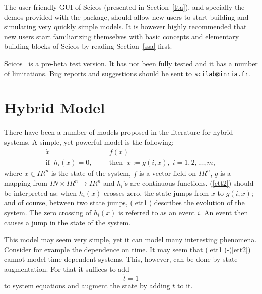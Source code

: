The user-friendly GUI of Scicos   (presented in Section~\ref{tta}), 
and specially the demos provided with the package, should allow new
users to start building and simulating very quickly simple models. It
is however highly recommended that new  users start familiarizing
themselves with basic concepts and elementary building blocks of
Scicos   by reading Section~\ref{ssa} first.  

Scicos  \version\ is a pre-beta test version. It has not been fully tested
and it has a number of limitations. Bug reports and suggestions should
be sent to {\tt scilab@inria.fr}.



\setcounter{equation}{0}
\section{Hybrid Model}
There have been a number of models proposed in the literature for
hybrid systems. A simple, yet powerful model is the following:
\begin{eqnarray}
\dot{x} &=& f(x) \label{ett1} \\
\mbox{if}\;\;h_i(x)=0,&&\mbox{then}\;\;x:=g(i,x) ,\;i=1,2,...,m, \label{ett2}
\end{eqnarray}
where $x\in I\!\!R^n$ is the state of the system, $f$ is a vector
field on $I\!\!R^n$, $g$ is a mapping from $I\!\!N\times I\!\!R^n
\rightarrow I\!\!R^n$ and $h_i$'s are continuous
functions. (\ref{ett2}) should be interpreted as: when $h_i(x)$ crosses
zero, the state jumps from $x$ to $g(i,x)$; and of course, between two
state jumps, (\ref{ett1}) describes the evolution of the system. The
zero crossing of $h_i(x)$ is referred to as an event $i$. An event
then causes a jump in the state of the system.

This model may seem very simple, yet it can model many interesting
phenomena. Consider for example the dependence on time. It may seem that
(\ref{ett1})-(\ref{ett2}) cannot model time-dependent systems. This,
however, can be done by state augmentation. For that it suffices to
add 
\begin{equation}
\dot{t}=1
\end{equation}
to system equations and augment the state by adding $t$ to it. 

